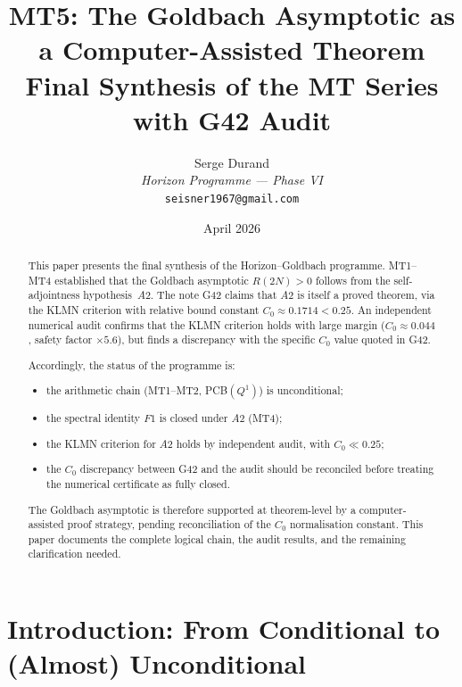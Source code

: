 \documentclass[11pt,a4paper]{article}
\title{\textbf{MT5: The Goldbach Asymptotic as a Computer-Assisted Theorem}\\[6pt]
\large Final Synthesis of the MT Series with G42 Audit}
\author{Serge Durand\\
\textit{Horizon Programme --- Phase VI}\\
\texttt{seisner1967@gmail.com}}
\date{April 2026}
\begin{document}
\maketitle

\begin{abstract}
This paper presents the final synthesis of the Horizon--Goldbach programme.  MT1--MT4 established that the Goldbach asymptotic $R(2N)>0$ follows from the self-adjointness hypothesis~$A2$.  The note G42 claims that $A2$ is itself a proved theorem, via the KLMN criterion with relative bound constant $C_0\approx 0.1714 < 0.25$.  An independent numerical audit confirms that the KLMN criterion holds with large margin ($C_0\approx 0.044$, safety factor $\times 5.6$), but finds a discrepancy with the specific $C_0$ value quoted in G42.

Accordingly, the status of the programme is:
\begin{itemize}[nosep]
    \item the arithmetic chain (MT1--MT2, PCB$(Q^1)$) is unconditional;
    \item the spectral identity $F1$ is closed under $A2$ (MT4);
    \item the KLMN criterion for $A2$ holds by independent audit, with $C_0\ll 0.25$;
    \item the $C_0$ discrepancy between G42 and the audit should be reconciled before treating the numerical certificate as fully closed.
\end{itemize}
The Goldbach asymptotic is therefore supported at theorem-level by a computer-assisted proof strategy, pending reconciliation of the $C_0$ normalisation constant.  This paper documents the complete logical chain, the audit results, and the remaining clarification needed.
\end{abstract}

\bigskip
\begin{center}
\end{center}
\bigskip

\tableofcontents

\section{Introduction: From Conditional to (Almost) Unconditional}
\end{document}
